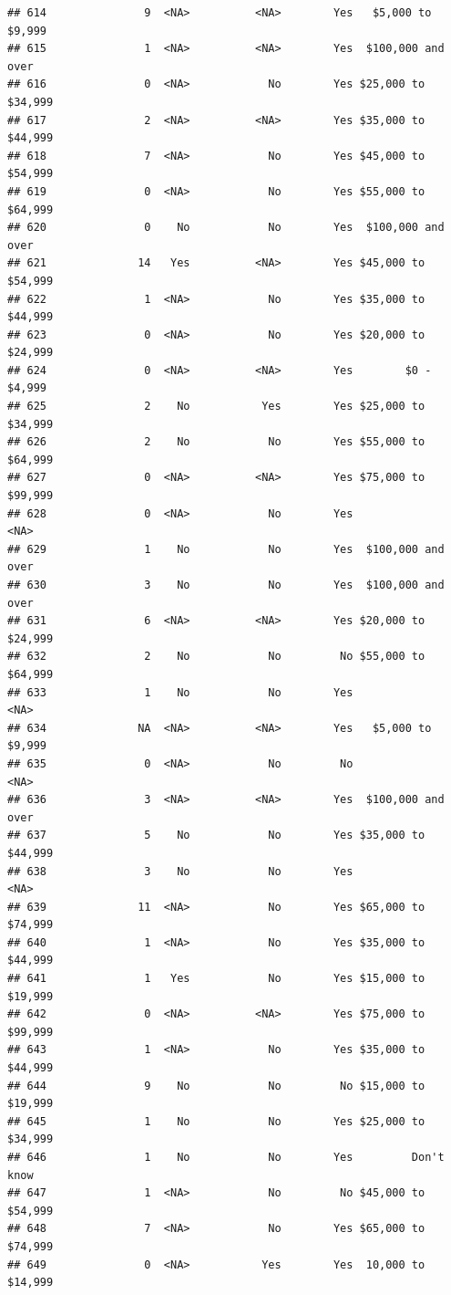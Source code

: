 \documentclass[man]{apa6}
\begin{document}
\begin{verbatim}
## 614               9  <NA>          <NA>        Yes   $5,000 to $9,999
## 615               1  <NA>          <NA>        Yes  $100,000 and over
## 616               0  <NA>            No        Yes $25,000 to $34,999
## 617               2  <NA>          <NA>        Yes $35,000 to $44,999
## 618               7  <NA>            No        Yes $45,000 to $54,999
## 619               0  <NA>            No        Yes $55,000 to $64,999
## 620               0    No            No        Yes  $100,000 and over
## 621              14   Yes          <NA>        Yes $45,000 to $54,999
## 622               1  <NA>            No        Yes $35,000 to $44,999
## 623               0  <NA>            No        Yes $20,000 to $24,999
## 624               0  <NA>          <NA>        Yes        $0 - $4,999
## 625               2    No           Yes        Yes $25,000 to $34,999
## 626               2    No            No        Yes $55,000 to $64,999
## 627               0  <NA>          <NA>        Yes $75,000 to $99,999
## 628               0  <NA>            No        Yes               <NA>
## 629               1    No            No        Yes  $100,000 and over
## 630               3    No            No        Yes  $100,000 and over
## 631               6  <NA>          <NA>        Yes $20,000 to $24,999
## 632               2    No            No         No $55,000 to $64,999
## 633               1    No            No        Yes               <NA>
## 634              NA  <NA>          <NA>        Yes   $5,000 to $9,999
## 635               0  <NA>            No         No               <NA>
## 636               3  <NA>          <NA>        Yes  $100,000 and over
## 637               5    No            No        Yes $35,000 to $44,999
## 638               3    No            No        Yes               <NA>
## 639              11  <NA>            No        Yes $65,000 to $74,999
## 640               1  <NA>            No        Yes $35,000 to $44,999
## 641               1   Yes            No        Yes $15,000 to $19,999
## 642               0  <NA>          <NA>        Yes $75,000 to $99,999
## 643               1  <NA>            No        Yes $35,000 to $44,999
## 644               9    No            No         No $15,000 to $19,999
## 645               1    No            No        Yes $25,000 to $34,999
## 646               1    No            No        Yes         Don't know
## 647               1  <NA>            No         No $45,000 to $54,999
## 648               7  <NA>            No        Yes $65,000 to $74,999
## 649               0  <NA>           Yes        Yes  10,000 to $14,999

\end{verbatim}
\end{document}
